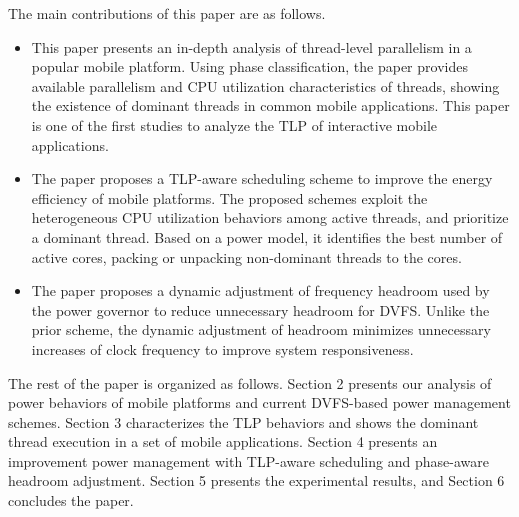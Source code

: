 The main contributions of this paper are as follows.

\begin{itemize}

\item This paper presents an in-depth analysis of thread-level parallelism in a popular mobile platform. Using
phase classification, the paper provides available parallelism and CPU utilization characteristics of threads, showing
the existence of dominant threads in common mobile applications. This paper is one of the first studies to analyze 
the TLP of interactive mobile applications.

\item The paper proposes a TLP-aware scheduling scheme to improve the energy efficiency of mobile platforms. The proposed
schemes exploit the heterogeneous CPU utilization behaviors among active threads, and prioritize a dominant thread.
Based on a power model, it identifies the best number of active cores, packing or unpacking non-dominant threads
to the cores.

\item The paper proposes a dynamic adjustment of frequency headroom used by the power governor  to reduce unnecessary 
headroom for DVFS. Unlike the prior scheme, the dynamic adjustment of headroom minimizes unnecessary increases
of clock frequency to improve system responsiveness.

\end{itemize}

The rest of the paper is organized as follows.
Section 2 presents our analysis of power behaviors of mobile platforms and current DVFS-based power management schemes.
Section 3 characterizes the TLP behaviors and shows the dominant thread execution in a set of mobile applications.
Section 4 presents an improvement power management with TLP-aware scheduling and phase-aware headroom adjustment.
Section 5 presents the experimental results, and Section 6 concludes the paper.



